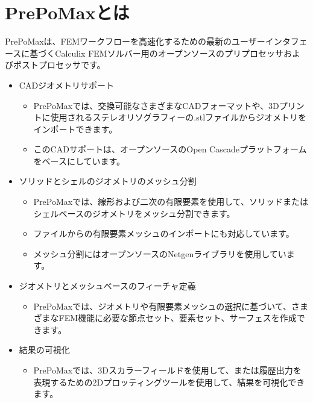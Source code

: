 \documentclass[a4j,20pt,slide]{ltjsarticle}
\begin{document}
\section{PrePoMaxとは}\label{sec:1.0}
PrePoMaxは、FEMワークフローを高速化するための最新のユーザーインタフェースに基づくCalculix FEMソルバー用のオープンソースのプリプロセッサおよびポストプロセッサです。
\begin{itemize}
	\item CADジオメトリサポート
	      \begin{itemize}
		      \item PrePoMaxでは、交換可能なさまざまなCADフォーマットや、3Dプリントに使用されるステレオリソグラフィーの.stlファイルからジオメトリをインポートできます。
		      \item このCADサポートは、オープンソースのOpen Cascadeプラットフォームをベースにしています。
	      \end{itemize}
	\item ソリッドとシェルのジオメトリのメッシュ分割
	      \begin{itemize}
		      \item PrePoMaxでは、線形および二次の有限要素を使用して、ソリッドまたはシェルベースのジオメトリをメッシュ分割できます。
		      \item ファイルからの有限要素メッシュのインポートにも対応しています。
		      \item メッシュ分割にはオープンソースのNetgenライブラリを使用しています。
	      \end{itemize}
	\item ジオメトリとメッシュベースのフィーチャ定義
	      \begin{itemize}
		      \item PrePoMaxでは、ジオメトリや有限要素メッシュの選択に基づいて、さまざまなFEM機能に必要な節点セット、要素セット、サーフェスを作成できます。
	      \end{itemize}
	\item 結果の可視化
	      \begin{itemize}
		      \item PrePoMaxでは、3Dスカラーフィールドを使用して、または履歴出力を表現するための2Dプロッティングツールを使用して、結果を可視化できます。
	      \end{itemize}
\end{itemize}
%
\end{document}
